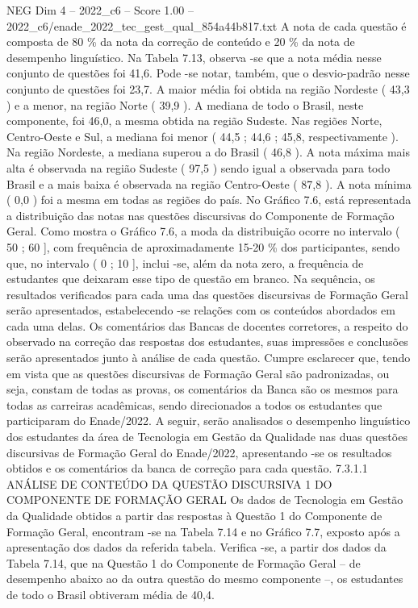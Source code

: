 \begin{textsample}{NEG Dim 4 – 2022\_c6 – Score 1.00 – 2022\_c6/enade\_2022\_tec\_gest\_qual\_854a44b817.txt}
A nota de cada questão é composta de 80 \% da nota da correção de conteúdo e 20 \% da nota de desempenho linguístico.
Na Tabela 7.13, observa -se que a nota média nesse conjunto de questões foi 41,6.
Pode -se notar, também, que o desvio-padrão nesse conjunto de questões foi 23,7.
A maior média foi obtida na região Nordeste ( 43,3 ) e a menor, na região Norte ( 39,9 ).
A mediana de todo o Brasil, neste componente, foi 46,0, a mesma obtida na região Sudeste.
Nas regiões Norte, Centro-Oeste e Sul, a mediana foi menor ( 44,5 ; 44,6 ; 45,8, respectivamente ).
Na região Nordeste, a mediana superou a do Brasil ( 46,8 ).
A nota máxima mais alta é observada na região Sudeste ( 97,5 ) sendo igual a observada para todo Brasil e a mais baixa é observada na região Centro-Oeste ( 87,8 ).
A nota mínima ( 0,0 ) foi a mesma em todas as regiões do país.
No Gráfico 7.6, está representada a distribuição das notas nas questões discursivas do Componente de Formação Geral.
Como mostra o Gráfico 7.6, a moda da distribuição ocorre no intervalo ( 50 ; 60 ], com frequência de aproximadamente 15-20 \% dos participantes, sendo que, no intervalo ( 0 ; 10 ], inclui -se, além da nota zero, a frequência de estudantes que deixaram esse tipo de questão em branco.
Na sequência, os resultados verificados para cada uma das questões discursivas de Formação Geral serão apresentados, estabelecendo -se relações com os conteúdos abordados em cada uma delas.
Os comentários das Bancas de docentes corretores, a respeito do observado na correção das respostas dos estudantes, suas impressões e conclusões serão apresentados junto à análise de cada questão.
Cumpre esclarecer que, tendo em vista que as questões discursivas de Formação Geral são padronizadas, ou seja, constam de todas as provas, os comentários da Banca são os mesmos para todas as carreiras acadêmicas, sendo direcionados a todos os estudantes que participaram do Enade/2022.
A seguir, serão analisados o desempenho linguístico dos estudantes da área de Tecnologia em Gestão da Qualidade nas duas questões discursivas de Formação Geral do Enade/2022, apresentando -se os resultados obtidos e os comentários da banca de correção para cada questão. 7.3.1.1 ANÁLISE DE CONTEÚDO DA QUESTÃO DISCURSIVA 1 DO COMPONENTE DE FORMAÇÃO GERAL Os dados de Tecnologia em Gestão da Qualidade obtidos a partir das respostas à Questão 1 do Componente de Formação Geral, encontram -se na Tabela 7.14 e no Gráfico 7.7, exposto após a apresentação dos dados da referida tabela.
Verifica -se, a partir dos dados da Tabela 7.14, que na Questão 1 do Componente de Formação Geral – de desempenho abaixo ao da outra questão do mesmo componente –, os estudantes de todo o Brasil obtiveram média de 40,4.

\end{textsample}
